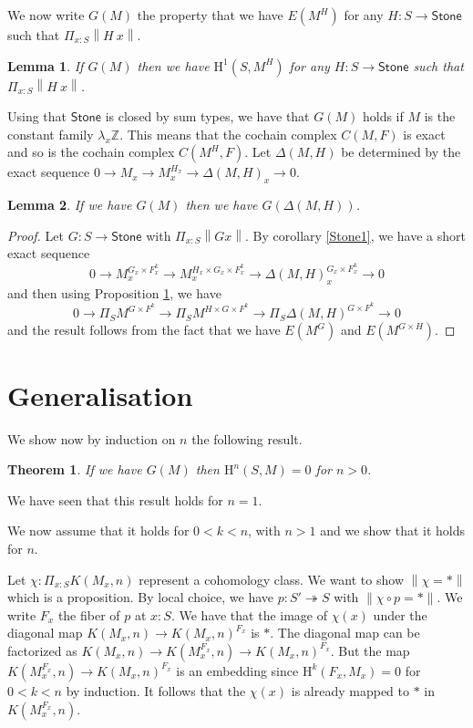 \documentclass[10pt,a4paper]{article}
\newtheorem{theorem}{Theorem}[section]
\newtheorem{lemma}{Lemma}[section]
\newcommand\HH{\mathrm{H}}
\newcommand{\ints}{\mathbb{Z}}
\newcommand{\ODisc}{\mathsf{ODisc}}
\newcommand{\Stone}{\mathsf{Stone}}
\newcommand{\ras}{\twoheadrightarrow}
\newcommand\norm[1]{\left\lVert #1 \right\rVert}
\begin{document}
We now write $G(M)$ the property that we have $E(M^H)$ for any $H:S\rightarrow\Stone$ such that
$\Pi_{x:S}\norm{H~x}$.

\begin{lemma}\label{Stone2}
  If $G(M)$ then we have $\HH^1(S,M^H)$  for any $H:S\rightarrow\Stone$ such that
$\Pi_{x:S}\norm{H~x}$.
\end{lemma}


Using that $\Stone$ is closed by sum types, we have that $G(M)$ holds if $M$ is the constant family $\lambda_x \ints$.
This means that the cochain complex $C(M,F)$ is exact and so is the cochain complex $C(M^H,F)$. Let $\Delta(M,H)$ be
determined by the exact sequence $0\rightarrow M_x\rightarrow M_x^{H_x}\rightarrow \Delta(M,H)_x\rightarrow 0$.

\begin{lemma}
  If we have $G(M)$ then we have $G(\Delta(M,H))$.
\end{lemma}

\begin{proof}
  Let $G:S\rightarrow \Stone$ with $\Pi_{x:S}\norm{Gx}$. By corollary \ref{Stone1}, we have a short exact sequence
  \[
  0\rightarrow M_x^{G_x\times F_x^k}\rightarrow M_x^{H_x\times G_x\times F_x^k}\rightarrow \Delta(M,H)_x^{G_x\times F_x^k}\rightarrow 0
  \]
  and then using Proposition \ref{Stone2}, we have
  \[
  0\rightarrow \Pi_S M^{G\times F^k}\rightarrow \Pi_S M^{H\times G\times F^k}\rightarrow \Pi_S \Delta(M,H)^{G\times F^k}\rightarrow 0
  \]
  and the result follows from the fact that we have $E(M^G)$ and $E(M^{G\times H}).$
\end{proof}



\section{Generalisation}

We show now by induction on $n$ the following result.

\begin{theorem}\label{Stone}
  If we have $G(M)$ then $\HH^n(S,M) = 0$ for $n>0$.
\end{theorem}

We have seen that this result holds for $n=1$.

We now assume that it holds for $0<k<n$, with $n>1$ and we show that it holds for $n$.

Let $\chi:\Pi_{x:S}K(M_x,n)$ represent a cohomology class. We want to show
$\norm{\chi = *}$ which is a proposition.
By local choice, we have $p:S'\ras S$ with $\norm{\chi\circ p = *}$.
We write $F_x$ the fiber of $p$ at $x:S$. We have that the image of $\chi(x)$
under the diagonal map $K(M_x,n)\rightarrow K(M_x,n)^{F_x}$ is $*$. The diagonal
map can be factorized as
$K(M_x,n)\rightarrow K(M_x^{F_x},n)\rightarrow K(M_x,n)^{F_x}$. But the
map $ K(M_x^{F_x},n)\rightarrow K(M_x,n)^{F_x}$ is an embedding since
$\HH^{k}(F_x,M_x) = 0$ for $0<k<n$ by induction. It follows that the $\chi(x)$
is already mapped to $*$ in $K(M_x^{F_x},n)$.
\end{document}
